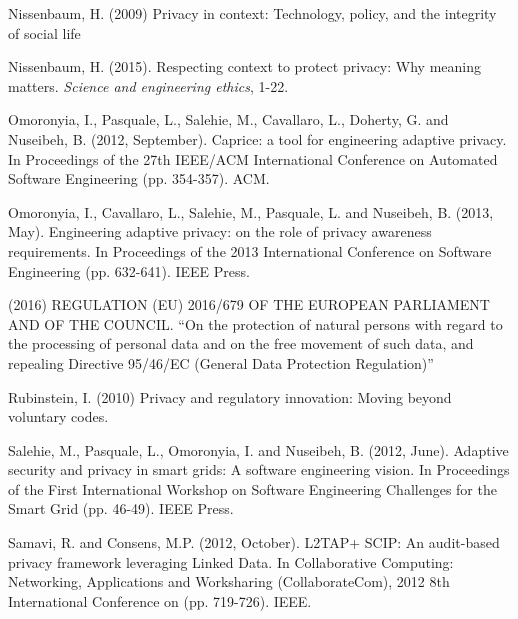 \documentclass[../thesis.tex]{subfiles}
\begin{document}
\bigskip

Nissenbaum, H. (2009)
Privacy in
context: Technology, policy, and the integrity of social
life \cite{nissenbaum2009privacy}

\bigskip

Nissenbaum, H. (2015). Respecting context to protect privacy: Why
meaning matters. \textit{Science and engineering ethics}, 1-22.
\cite{nissenbaum2015respecting}

\bigskip

Omoronyia, I., Pasquale, L., Salehie, M., Cavallaro, L., Doherty, G. and
Nuseibeh, B. (2012, September). Caprice: a tool for engineering
adaptive privacy. In Proceedings of the 27th IEEE/ACM International
Conference on Automated Software Engineering (pp. 354-357). ACM.
\cite{omoronyia2012caprice}

\bigskip

Omoronyia, I., Cavallaro, L., Salehie, M., Pasquale, L. and Nuseibeh, B.
(2013, May). Engineering adaptive privacy: on the role of privacy
awareness requirements. In Proceedings of the 2013 International
Conference on Software Engineering (pp. 632-641). IEEE Press.
\cite{omoronyia2013engineering}

\bigskip

(2016) REGULATION (EU) 2016/679 OF THE EUROPEAN PARLIAMENT AND OF THE
COUNCIL. ``On the protection of natural persons with
regard to the processing of personal data and on the free movement of
such data, and repealing Directive 95/46/EC (General Data Protection
Regulation)''
\cite{regulation2016regulation}

\bigskip

Rubinstein, I. (2010)
Privacy and regulatory innovation: Moving beyond
voluntary codes.
\cite{rubinstein2010privacy}


\bigskip

Salehie, M., Pasquale, L., Omoronyia, I. and Nuseibeh, B. (2012, June).
Adaptive security and privacy in smart grids: A software engineering
vision. In Proceedings of the First International Workshop on Software
Engineering Challenges for the Smart Grid (pp. 46-49). IEEE Press.
\cite{salehie2012adaptive}

\bigskip

Samavi, R. and Consens, M.P. (2012, October). L2TAP+ SCIP: An
audit-based privacy framework leveraging Linked Data. In Collaborative
Computing: Networking, Applications and Worksharing (CollaborateCom),
2012 8th International Conference on (pp. 719-726). IEEE.
\cite{samavi2012l2tap+}
\end{document}
